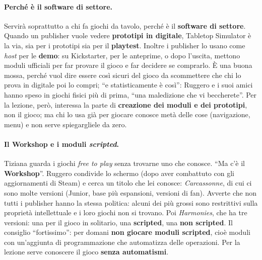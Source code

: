 \paragraph{Perché è il software di settore.} Servirà soprattutto a chi fa giochi da
tavolo, perché è il \textbf{software di settore}. Quando un publisher vuole vedere
\textbf{prototipi in digitale}, Tabletop Simulator è la via, sia per i prototipi sia
per il \textbf{playtest}. Inoltre i publisher lo usano come \emph{host} per le
\textbf{demo}: su Kickstarter, per le anteprime, o dopo l'uscita, mettono moduli
ufficiali per far provare il gioco e far decidere se comprarlo. È una buona mossa,
perché vuol dire essere così sicuri del gioco da scommettere che chi lo prova in
digitale poi lo compri; ``e statisticamente è così'': Ruggero e i suoi amici hanno
speso in giochi fisici più di prima, ``una maledizione che vi beccherete''. Per la
lezione, però, interessa la parte di \textbf{creazione dei moduli e dei prototipi},
non il gioco; ma chi lo usa già per giocare conosce metà delle cose (navigazione,
menu) e non serve spiegargliele da zero.

\paragraph{Il Workshop e i moduli \emph{scripted}.} Tiziana guarda i giochi
\emph{free to play} senza trovarne uno che conosce. ``Ma c'è il \textbf{Workshop}''.
Ruggero condivide lo schermo (dopo aver combattuto con gli aggiornamenti di Steam) e
cerca un titolo che lei conosce: \emph{Carcassonne}, di cui ci sono molte versioni
(Junior, base più espansioni, versioni di fan). Avverte che non tutti i publisher
hanno la stessa politica: alcuni dei più grossi sono restrittivi sulla proprietà
intellettuale e i loro giochi non si trovano. Poi \emph{Harmonies}, che ha tre
versioni: una per il gioco in solitario, una \textbf{scripted}, una \textbf{non
scripted}. Il consiglio ``fortissimo'': per domani \textbf{non giocare moduli
scripted}, cioè moduli con un'aggiunta di programmazione che automatizza delle
operazioni. Per la lezione serve conoscere il gioco \textbf{senza automatismi}.

